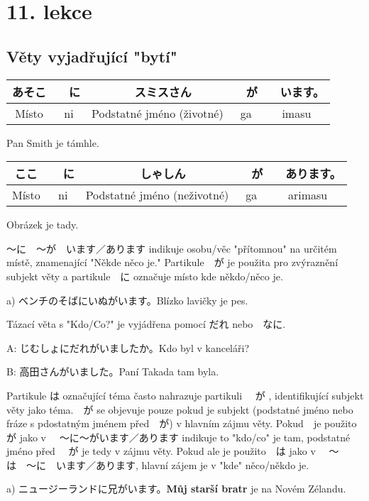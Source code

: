 \section{11. lekce}
\label{sec:lekce_11}

\subsection{Věty vyjadřující "bytí"}

\begin{center}
\begin{tabular}{|c|c|c|c|c|}
\hline
あそこ&　に&　スミスさん&　が&　います。\\
\hline
Místo & ni&Podstatné jméno (životné)&ga&imasu\\
\hline
\end{tabular}
\end{center}
Pan Smith je támhle.


\begin{center}
\begin{tabular}{|c|c|c|c|c|}
\hline
ここ&　に&　しゃしん&　が&　あります。\\
\hline
Místo & ni & Podstatné jméno (neživotné) & ga&arimasu\\
\hline
\end{tabular}
\end{center}
Obrázek je tady.

〜に　〜が　います／あります indikuje osobu/věc "přítomnou" na určitém místě, znamenající "Někde něco je." Partikule　が je použita pro zvýraznění subjekt věty a partikule　に označuje místo kde někdo/něco je.

a) ベンチのそばにいぬがいます。Blízko lavičky je pes.

Tázací věta s "Kdo/Co?" je vyjádřena pomocí だれ nebo　なに.　

A: じむしょにだれがいましたか。Kdo byl v kanceláři?

B: 高田さんがいました。Paní Takada tam byla.


Partikule は označující téma často nahrazuje partikuli 　が , identifikující subjekt věty jako téma.　が se objevuje pouze pokud je subjekt (podstatné jméno nebo fráze s pdostatným jménem před　が) v hlavním zájmu věty. Pokud　je použito が jako v 　〜に〜がいます／あります indikuje to "kdo/co" je tam, podstatné jméno před 　が je tedy v zájmu věty. Pokud ale je použito　は jako v 　〜は　〜に　います／あります, hlavní zájem je v "kde" něco/někdo je.

a) ニュージーランドに兄がいます。\textbf{Můj starší bratr} je na Novém Zélandu.

